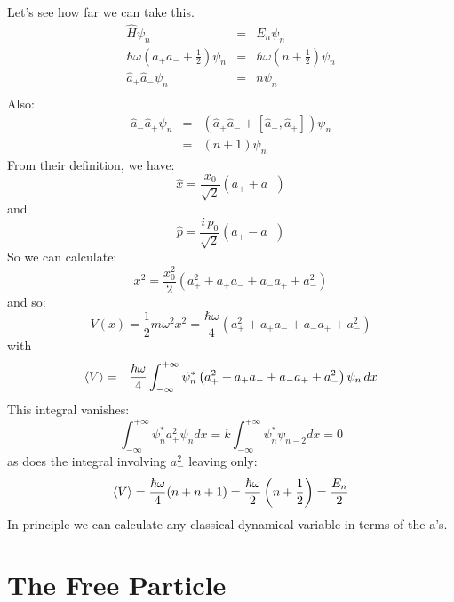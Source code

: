 \documentclass[12pt]{book}
\begin{document}
Let's see how far we can take this.
\begin{eqnarray*}
\hat{H} \psi_n &=& E_n \psi_n \\
\hbar\omega \left( a_+ a_- + \frac{1}{2} \right) \psi_n &=& \hbar \omega \left(n + \frac{1}{2} \right) \psi_n \\
\hat{a}_+ \hat{a}_- \psi_n &=& n \psi_n \\
\end{eqnarray*}
Also:
\begin{eqnarray*}
\hat{a}_- \hat{a}_+ \psi_n &=& \left(\hat{a}_+\hat{a}_- + [\hat{a}_-,\hat{a}_+]\right) \psi_n \\
&=& (n+1) \psi_n
\end{eqnarray*}
From their definition, we have:
\begin{equation*}
\hat{x} = \frac{x_0}{\sqrt{2}} \left( a_+ + a_-\right)
\end{equation*}
and 
\begin{equation*}
\hat{p} = \frac{i\,p_0}{\sqrt{2}} \left( a_+ - a_-\right)
\end{equation*}
So we can calculate:
\begin{equation*}
x^2 = \frac{x_0^2}{2} \left( a_+^2 + a_+a_- + a_-a_+ + a_-^2 \right)
\end{equation*}
and so:
\begin{equation*}
V(x) = \frac{1}{2}m \omega^2 x^2= \frac{\hbar \omega}{4} \left( a_+^2 + a_+a_- + a_-a_+ + a_-^2 \right)
\end{equation*}
with
\begin{eqnarray*}
\braket{V} &=& \frac{\hbar \omega}{4} \int_{-\infty}^{+\infty} \psi_n^* \left( a_+^2 + a_+a_- + a_-a_+ + a_-^2 \right) \psi_n \, dx
\end{eqnarray*}
This integral vanishes:
$$\int_{-\infty}^{+\infty} \psi_n^* a_+^2 \psi_n dx = k \int_{-\infty}^{+\infty} \psi_n^* \psi_{n-2} dx
 = 0 $$
as does the integral involving $a_-^2$ leaving only:
\begin{equation*}
\braket{V} = \frac{\hbar \omega}{4} (n + n + 1) = \frac{\hbar \omega}{2} \left(n + \frac{1}{2}\right) 
= \frac{E_n}{2}
\end{equation*}
In principle we can calculate any classical dynamical variable in terms of the a's.

\section{The Free Particle}
\end{document}
